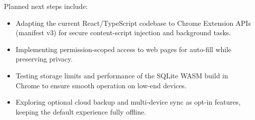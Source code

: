 Planned next steps include:
\begin{itemize}
  \item Adapting the current React/TypeScript codebase to Chrome Extension
        APIs (manifest v3) for secure content-script injection and
        background tasks.
  \item Implementing permission-scoped access to web pages for auto-fill
        while preserving privacy.
  \item Testing storage limits and performance of the SQLite WASM build in
        Chrome to ensure smooth operation on low-end devices.
  \item Exploring optional cloud backup and multi-device sync as opt-in
        features, keeping the default experience fully offline.
\end{itemize}




